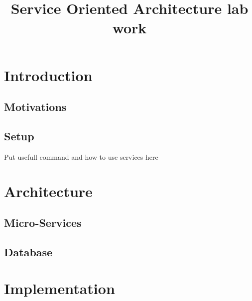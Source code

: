 \documentclass[12pt]{report}
\title{Service Oriented Architecture lab work}
\author{\small{}}
\begin{document}
 

\maketitle

\chapter{Introduction}
\section{Motivations}
\section{Setup}
Put usefull command and how to use services here

\chapter{Architecture}
\section{Micro-Services}
\section{Database}

\chapter{Implementation}
\end{document}
